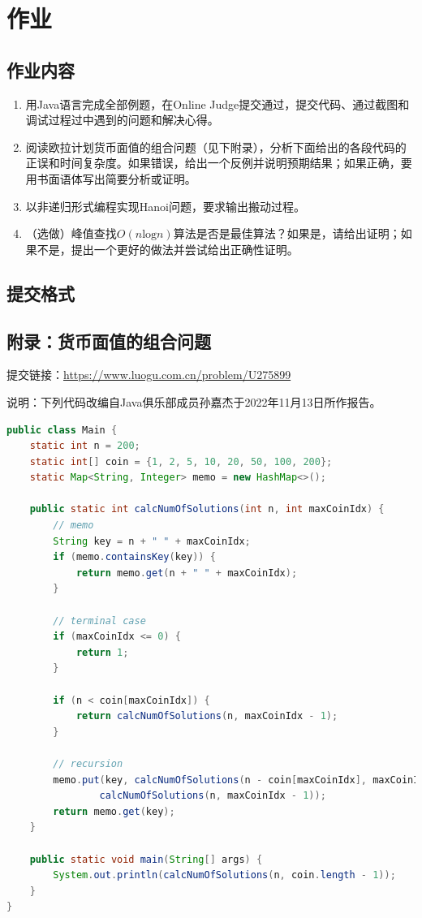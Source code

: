 \documentclass[12pt]{ctexart}
\begin{document}
\newpage
\section{作业}

\subsection{作业内容}
\begin{enumerate}
    \item 用Java语言完成全部例题，在Online Judge提交通过，提交代码、通过截图和调试过程过中遇到的问题和解决心得。
    \item 阅读欧拉计划货币面值的组合问题（见下附录），分析下面给出的各段代码的正误和时间复杂度。如果错误，给出一个反例并说明预期结果；如果正确，要用书面语体写出简要分析或证明。
    \item 以非递归形式编程实现Hanoi问题，要求输出搬动过程。
    \item （选做）峰值查找$O(n \text{log}n)$算法是否是最佳算法？如果是，请给出证明；如果不是，提出一个更好的做法并尝试给出正确性证明。
\end{enumerate}

\subsection{提交格式}

\subsection{附录：货币面值的组合问题}

提交链接：\url{https://www.luogu.com.cn/problem/U275899}

说明：下列代码改编自Java俱乐部成员孙嘉杰于2022年11月13日所作报告。

\newpage
\begin{lstlisting}[language={java},caption={Algorithm 1}]
public class Main {
    static int n = 200;
    static int[] coin = {1, 2, 5, 10, 20, 50, 100, 200};
    static Map<String, Integer> memo = new HashMap<>();

    public static int calcNumOfSolutions(int n, int maxCoinIdx) {
        // memo
        String key = n + " " + maxCoinIdx;
        if (memo.containsKey(key)) {
            return memo.get(n + " " + maxCoinIdx);
        }

        // terminal case
        if (maxCoinIdx <= 0) {
            return 1;
        }

        if (n < coin[maxCoinIdx]) {
            return calcNumOfSolutions(n, maxCoinIdx - 1);
        }

        // recursion
        memo.put(key, calcNumOfSolutions(n - coin[maxCoinIdx], maxCoinIdx) +
                calcNumOfSolutions(n, maxCoinIdx - 1));
        return memo.get(key);
    }

    public static void main(String[] args) {
        System.out.println(calcNumOfSolutions(n, coin.length - 1));
    }
}
\end{lstlisting}
\end{document}
